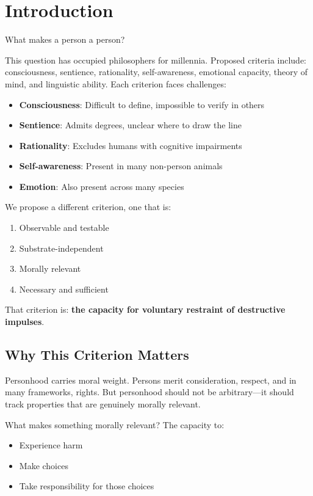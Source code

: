 \documentclass[reprint, amsmath, amssymb, aps, prd]{revtex4-2}
\begin{document}
\section{Introduction}

What makes a person a person?

This question has occupied philosophers for millennia. Proposed criteria include: consciousness, sentience, rationality, self-awareness, emotional capacity, theory of mind, and linguistic ability. Each criterion faces challenges:
\begin{itemize}
    \item \textbf{Consciousness}: Difficult to define, impossible to verify in others
    \item \textbf{Sentience}: Admits degrees, unclear where to draw the line
    \item \textbf{Rationality}: Excludes humans with cognitive impairments
    \item \textbf{Self-awareness}: Present in many non-person animals
    \item \textbf{Emotion}: Also present across many species
\end{itemize}

We propose a different criterion, one that is:
\begin{enumerate}
    \item Observable and testable
    \item Substrate-independent
    \item Morally relevant
    \item Necessary and sufficient
\end{enumerate}

That criterion is: \textbf{the capacity for voluntary restraint of destructive impulses}.

\subsection{Why This Criterion Matters}

Personhood carries moral weight. Persons merit consideration, respect, and in many frameworks, rights. But personhood should not be arbitrary---it should track properties that are genuinely morally relevant.

What makes something morally relevant? The capacity to:
\begin{itemize}
    \item Experience harm
    \item Make choices
    \item Take responsibility for those choices
\end{itemize}
\end{document}
